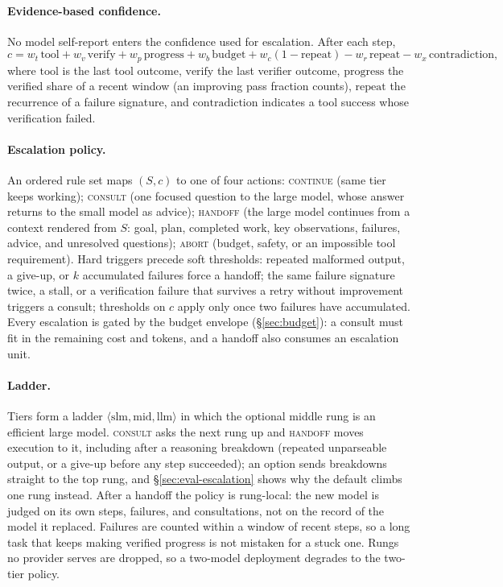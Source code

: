 \paragraph{Evidence-based confidence.}
No model self-report enters the confidence used for escalation.
After each step,
\begin{equation}
c = w_t\,\mathrm{tool} + w_v\,\mathrm{verify} + w_p\,\mathrm{progress} + w_b\,\mathrm{budget} + w_c(1-\mathrm{repeat}) - w_r\,\mathrm{repeat} - w_x\,\mathrm{contradiction},
\end{equation}
where $\mathrm{tool}$ is the last tool outcome, $\mathrm{verify}$ the last verifier outcome, $\mathrm{progress}$ the verified share of a recent window (an improving pass fraction counts), $\mathrm{repeat}$ the recurrence of a failure signature, and $\mathrm{contradiction}$ indicates a tool success whose verification failed.

\paragraph{Escalation policy.}
An ordered rule set maps $(S, c)$ to one of four actions:
\textsc{continue} (same tier keeps working);
\textsc{consult} (one focused question to the large model, whose answer returns to the small model as advice);
\textsc{handoff} (the large model continues from a context rendered from $S$: goal, plan, completed work, key observations, failures, advice, and unresolved questions);
\textsc{abort} (budget, safety, or an impossible tool requirement).
Hard triggers precede soft thresholds: repeated malformed output, a give-up, or $k$ accumulated failures force a handoff; the same failure signature twice, a stall, or a verification failure that survives a retry without improvement triggers a consult; thresholds on $c$ apply only once two failures have accumulated.
Every escalation is gated by the budget envelope (\S\ref{sec:budget}): a consult must fit in the remaining cost and tokens, and a handoff also consumes an escalation unit.

\paragraph{Ladder.}
Tiers form a ladder $\langle \text{slm}, \text{mid}, \text{llm} \rangle$ in which the optional middle rung is an efficient large model.
\textsc{consult} asks the next rung up and \textsc{handoff} moves execution to it, including after a reasoning breakdown (repeated unparseable output, or a give-up before any step succeeded); an option sends breakdowns straight to the top rung, and \S\ref{sec:eval-escalation} shows why the default climbs one rung instead.
After a handoff the policy is rung-local: the new model is judged on its own steps, failures, and consultations, not on the record of the model it replaced.
Failures are counted within a window of recent steps, so a long task that keeps making verified progress is not mistaken for a stuck one.
Rungs no provider serves are dropped, so a two-model deployment degrades to the two-tier policy.

